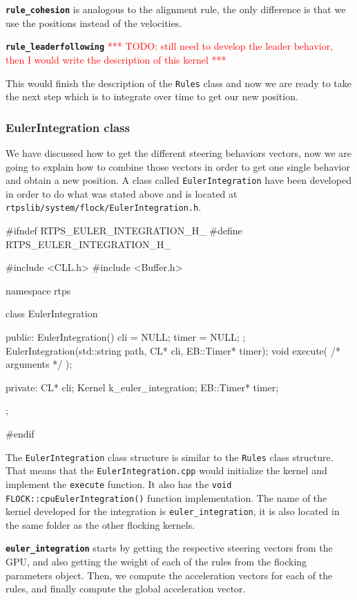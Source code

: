 \texttt{\textbf{rule\_cohesion}} is analogous to the alignment rule, the only difference is that we use the positions instead of the velocities.

\texttt{\textbf{rule\_leaderfollowing}} \textcolor{red}{*** TODO: still need to develop the leader behavior, then I would write the description of this kernel ***}

This would finish the description of the \texttt{Rules} class and now we are ready to take the next step which is to integrate over time to get our new position.

\subsubsection{EulerIntegration class}
We have discussed how to get the different steering behaviors vectors, now we are going to explain how to combine those vectors in order to get one single behavior and obtain a new position. A class called \texttt{EulerIntegration} have been developed in order to do what was stated above and is located at \texttt{rtpslib/system/flock/EulerIntegration.h}.

\begin{cppcode}{0}
#ifndef RTPS_EULER_INTEGRATION_H_
#define RTPS_EULER_INTEGRATION_H_

#include <CLL.h>
#include <Buffer.h>

namespace rtps
{
	class EulerIntegration
	{
		public:
			EulerIntegration() { cli = NULL; timer = NULL; };
	 		EulerIntegration(std::string path, CL* cli, EB::Timer* timer);
			void execute( /* arguments */ );

		private:
			CL* cli;
			Kernel k_euler_integration;
			EB::Timer* timer;
	};
}
#endif
\end{cppcode}

The \texttt{EulerIntegration} class structure is similar to the \texttt{Rules} class structure. That means that the \texttt{EulerIntegration.cpp} would initialize the kernel and implement the \texttt{execute} function. It also has the \texttt{void FLOCK::cpuEulerIntegration()} function implementation. The name of the kernel developed for the integration is \texttt{euler\_integration}, it is also located in the same folder as the other flocking kernels.

\texttt{\textbf{euler\_integration}} starts by getting the respective steering vectors from the GPU, and also getting the weight of each of the rules from the flocking parameters object. Then, we compute the acceleration vectors for each of the rules, and finally compute the global acceleration vector.


